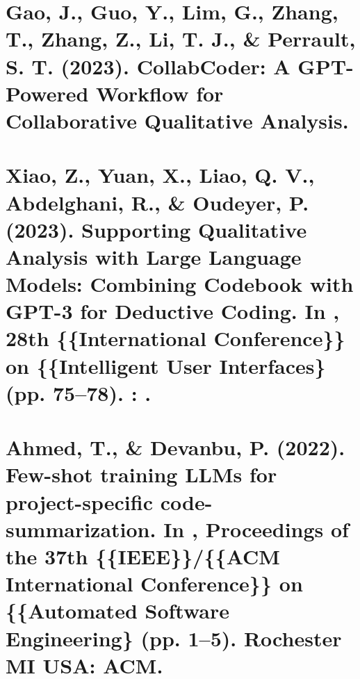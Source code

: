 \documentclass[11pt]{article}
\begin{document}
\section{Gao, J., Guo, Y., Lim, G., Zhang, T., Zhang, Z., Li, T. J., \& Perrault, S. T.  (2023). CollabCoder: A GPT-Powered Workflow for Collaborative Qualitative Analysis.}
\label{sec:org3de9069}

\section{Xiao, Z., Yuan, X., Liao, Q. V., Abdelghani, R., \& Oudeyer, P. (2023).  Supporting Qualitative Analysis with Large Language Models: Combining Codebook with GPT-3 for Deductive Coding. In , 28th \{\{International Conference\}\} on \{\{Intelligent User Interfaces\} (pp. 75–78). : .}
\label{sec:orgb4dd506}

\section{Ahmed, T., \& Devanbu, P. (2022). Few-shot training LLMs for project-specific code-summarization. In , Proceedings of the 37th \{\{IEEE\}\}/\{\{ACM International Conference\}\} on \{\{Automated Software Engineering\} (pp. 1–5). Rochester MI USA: ACM.}
\label{sec:org7dfbced}
\end{document}
